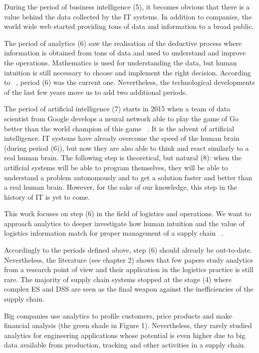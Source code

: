 During the period of business intelligence (5), it becomes obvious that there is a value behind the data collected by the IT systems. In addition to companies, the world wide web started providing tons of data and information to a broad public.\par

The period of analytics (6) saw the realisation of the deductive process where information is obtained from tons of data and used to understand and improve the operations. Mathematics is used for understanding the data, but human intuition is still necessary to choose and implement the right decision. According to ~\cite{Mortenson2015}, period (6) was the current one. Nevertheless, the technological developments of the last few years move us to add two additional periods.\par

The period of artificial intelligence (7) starts in 2015 when a team of data scientist from Google develops a neural network able to play the game of Go better than the world champion of this game ~\cite{Silver2016}. It is the advent of artificial intelligence. IT systems have already overcome the speed of the human brain (during period (6)), but now they are also able to think and react similarly to a real human brain. The following step is theoretical, but natural (8): when the artificial systems will be able to program themselves, they will be able to understand a problem autonomously and to get a solution faster and better than a real human brain. However, for the sake of our knowledge, this step in the history of IT is yet to come.\par

This work focuses on step (6) in the field of logistics and operations. We want to approach analytics to deeper investigate how human intuition and the value of logistics information match for proper management of a supply chain ~\cite{Arvan2019}.\par

Accordingly to the periods defined above, step (6) should already be out-to-date. Nevertheless, the literature (see chapter 2) shows that few papers study analytics from a research point of view and their application in the logistics practice is still rare. The majority of supply chain systems stopped at the stage (4) where complex ES and DSS are seen as the final weapon against the inefficiencies of the supply chain.\par

Big companies use analytics to profile customers, price products and make financial analysis (the green shade in Figure 1). Nevertheless, they rarely studied analytics for engineering applications whose potential is even higher due to big data available from production, tracking and other activities in a supply chain. 

